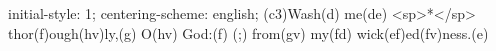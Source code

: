 initial-style: 1;
centering-scheme: english;
(c3)Wash(d) me(de) <sp>*</sp> thor(f)ough(hv)ly,(g) O(hv) God:(f) (;) from(gv) my(fd) wick(ef)ed(fv)ness.(e)

